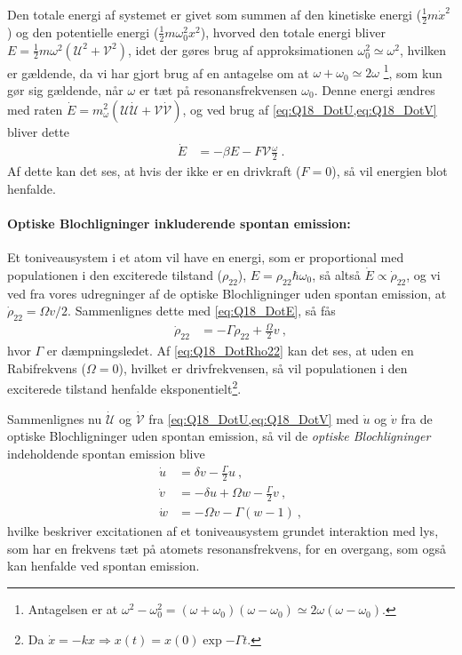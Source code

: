 Den totale energi af systemet er givet som summen af den kinetiske energi ($\frac{1}{2}m\Dot{x}^2$) og den potentielle energi ($\frac{1}{2}m\omega_0^2x^2$), hvorved den totale energi bliver $E = \frac{1}{2}m\omega^2(\mathcal{U}^2 + \mathcal{V}^2)$, idet der gøres brug af approksimationen $\omega_0^2 \simeq \omega^2$, hvilken er gældende, da vi har gjort brug af en antagelse om at $\omega + \omega_0 \simeq 2\omega$ \footnote{Antagelsen er at $\omega^2 - \omega_0^2 = (\omega + \omega_0)(\omega - \omega_0) \simeq 2\omega(\omega - \omega_0)$.}, som kun gør sig gældende, når $\omega$ er tæt på resonansfrekvensen $\omega_0$. Denne energi ændres med raten $\Dot{E} = m_\omega^2(\mathcal{U}\Dot{\mathcal{U}} + \mathcal{V}\Dot{\mathcal{V}})$, og ved brug af \cref{eq:Q18_DotU,eq:Q18_DotV} bliver dette
\begin{align} \label{eq:Q18_DotE}
    \Dot{E} &= -\beta E - F \mathcal{V}\frac{\omega}{2} \: .
\end{align}
Af dette kan det ses, at hvis der ikke er en drivkraft ($F = 0$), så vil energien blot henfalde.


\paragraph{Optiske Blochligninger inkluderende spontan emission:} Et toniveausystem i et atom vil have en energi, som er proportional med populationen i den exciterede tilstand ($\rho_{22}$), $E = \rho_{22}\hbar\omega_0$, så altså $\Dot{E} \propto \Dot{\rho}_{22}$, og vi ved fra vores udregninger af de optiske Blochligninger uden spontan emission, at $\Dot{\rho}_{22} = \Omega v/2$. Sammenlignes dette med \cref{eq:Q18_DotE}, så fås
\begin{align} \label{eq:Q18_DotRho22}
    \Dot{\rho}_{22} &= -\Gamma\rho_{22} + \frac{\Omega}{2}v \: ,
\end{align}
hvor $\Gamma$ er dæmpningsledet. Af \cref{eq:Q18_DotRho22} kan det ses, at uden en Rabifrekvens ($\Omega = 0$), hvilket er drivfrekvensen, så vil populationen i den exciterede tilstand henfalde eksponentielt\footnote{Da $\Dot{x} = -kx \Rightarrow x(t) = x(0)\exp{-\Gamma t}$.}.

Sammenlignes nu $\Dot{\mathcal{U}}$ og $\Dot{\mathcal{V}}$ fra \cref{eq:Q18_DotU,eq:Q18_DotV} med $\Dot{u}$ og $\Dot{v}$ fra de optiske Blochligninger uden spontan emission, så vil de \emph{optiske Blochligninger} indeholdende spontan emission blive
\begin{align}
    \Dot{u} &= \delta v - \frac{\Gamma}{2}u \: , \label{eq:Q18_DotLilleU} \\
    \Dot{v} &= -\delta u + \Omega w - \frac{\Gamma}{2}v \: , \label{eq:Q18_DotLilleV} \\
    \Dot{w} &= -\Omega v - \Gamma(w - 1) \: , \label{eq:Q18_DotLilleW}
\end{align}
hvilke beskriver excitationen af et toniveausystem grundet interaktion med lys, som har en frekvens tæt på atomets resonansfrekvens, for en overgang, som også kan henfalde ved spontan emission.

